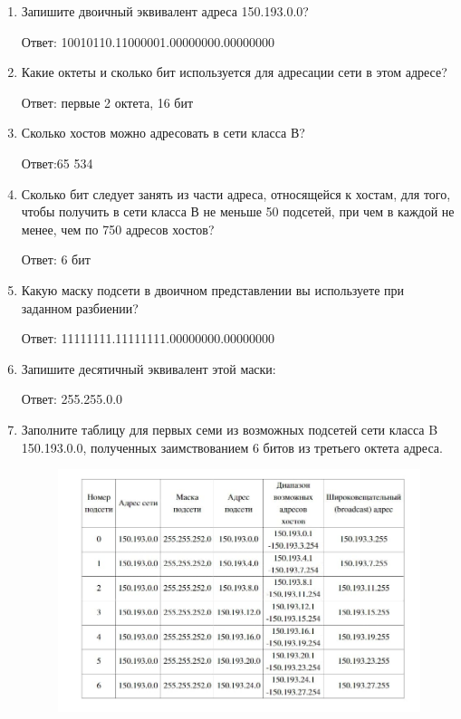 \documentclass[bachelor, och, labwork]{shiza}
\begin{document}
\begin{enumerate}

    \item Запишите двоичный эквивалент адреса 150.193.0.0?
    
    Ответ: 10010110.11000001.00000000.00000000
    \item Какие октеты и сколько бит используется для адресации сети в этом адресе?
    
    Ответ: первые 2 октета, 16 бит
    \item Сколько хостов можно адресовать в сети класса В? 
    
    Ответ:65 534
    \item Сколько бит следует занять из части адреса, относящейся к хостам, для того, чтобы получить в сети класса В не меньше 50 подсетей, при чем в каждой не менее, 
    чем по 750 адресов хостов?

    Ответ: 6 бит
    \item Какую маску подсети в двоичном представлении вы используете при заданном разбиении?
    
    Ответ: 11111111.11111111.00000000.00000000
    \item Запишите десятичный эквивалент этой маски: 
    
    Ответ: 255.255.0.0
    \item Заполните таблицу  для первых семи из возможных подсетей сети класса B 150.193.0.0, полученных заимствованием 6 битов из третьего октета адреса.
    
    \begin{figure}[H]
        \centering      %
        \includegraphics[width=1\textwidth]{4}
        \label{fig:image1}
    \end{figure}


\end{enumerate}
\end{document}
